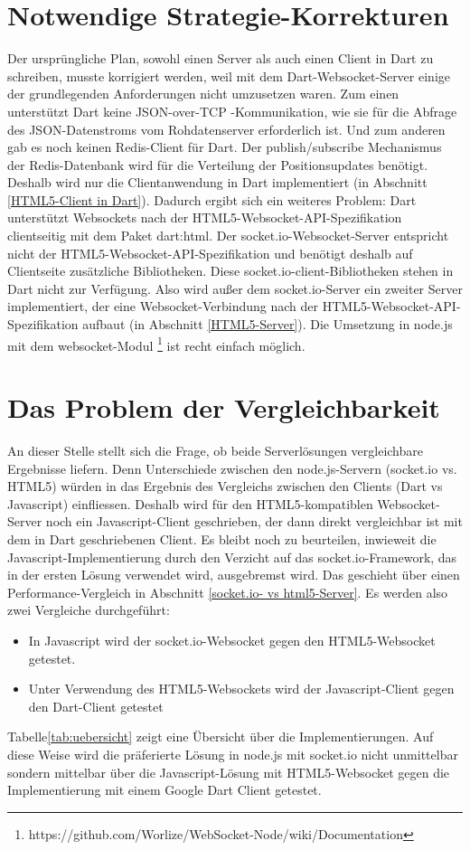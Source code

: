 \section{Notwendige Strategie-Korrekturen}\label{Strategie-Korrektur}
Der ursprüngliche Plan, sowohl einen Server als auch einen Client in Dart zu schreiben, musste korrigiert werden, weil mit dem Dart-Websocket-Server einige der grundlegenden Anforderungen nicht umzusetzen waren. Zum einen unterstützt Dart keine JSON-over-TCP -Kommunikation, wie sie für die Abfrage des JSON-Datenstroms vom Rohdatenserver erforderlich ist. Und zum anderen gab es noch keinen Redis-Client für Dart. Der publish/subscribe Mechanismus der Redis-Datenbank wird für die Verteilung der Positionsupdates benötigt.
Deshalb wird nur die Clientanwendung in Dart implementiert (in Abschnitt \ref{HTML5-Client in Dart}). Dadurch ergibt sich ein weiteres Problem: Dart unterstützt Websockets nach der HTML5-Websocket-API-Spezifikation clientseitig mit dem Paket dart:html. Der socket.io-Websocket-Server entspricht nicht der HTML5-Websocket-API-Spezifikation und benötigt deshalb auf Clientseite zusätzliche Bibliotheken. Diese socket.io-client-Bibliotheken stehen in Dart nicht zur Verfügung. 
Also wird außer dem socket.io-Server ein zweiter Server implementiert, der eine Websocket-Verbindung nach der HTML5-Websocket-API-Spezifikation aufbaut (in Abschnitt \ref{HTML5-Server}). Die Umsetzung in node.js mit dem websocket-Modul  \footnote{https://github.com/Worlize/WebSocket-Node/wiki/Documentation} ist recht einfach möglich.
\section{Das Problem der Vergleichbarkeit}\label{Vergleichbarkeit}
An dieser Stelle stellt sich die Frage, ob beide Serverlösungen vergleichbare Ergebnisse liefern. Denn Unterschiede zwischen den node.js-Servern (socket.io vs. HTML5) würden in das Ergebnis des Vergleichs zwischen den Clients (Dart vs Javascript) einfliessen. Deshalb wird für den HTML5-kompatiblen Websocket-Server noch ein Javascript-Client geschrieben, der dann direkt vergleichbar ist mit dem in Dart geschriebenen Client.
Es bleibt noch zu beurteilen, inwieweit die Javascript-Implementierung durch den Verzicht auf das socket.io-Framework, das in der ersten Lösung verwendet wird, ausgebremst wird. Das geschieht über einen Performance-Vergleich in Abschnitt \ref {socket.io- vs html5-Server}.
Es werden also zwei Vergleiche durchgeführt: 
\begin{itemize}
\item In Javascript wird der socket.io-Websocket gegen den HTML5-Websocket getestet.
\item Unter Verwendung des HTML5-Websockets wird der Javascript-Client gegen den Dart-Client getestet
\end{itemize}
Tabelle\ref{tab:uebersicht} zeigt eine Übersicht über die Implementierungen.
Auf diese Weise wird die präferierte Lösung in node.js mit socket.io nicht unmittelbar sondern mittelbar über die Javascript-Lösung mit HTML5-Websocket gegen die Implementierung mit einem Google Dart Client getestet.
\renewcommand{\arraystretch}{2}

